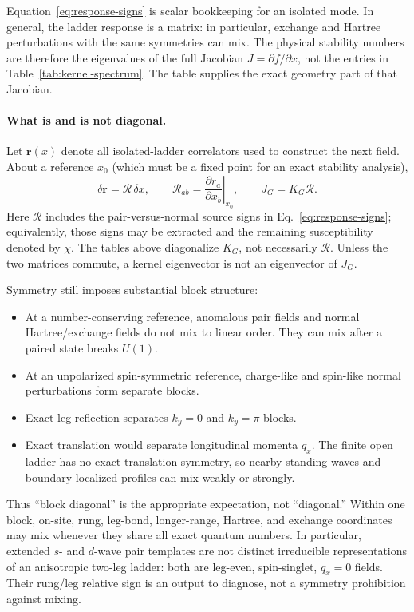 \documentclass[11pt]{article}
\begin{document}
Equation~\eqref{eq:response-signs} is scalar bookkeeping for an isolated mode.
In general, the ladder response is a matrix: in particular, exchange and
Hartree perturbations with the same symmetries can mix.  The physical stability
numbers are therefore the eigenvalues of the full Jacobian
\(J=\partial f/\partial x\), not the entries in
Table~\ref{tab:kernel-spectrum}.  The table supplies the exact geometry part of
that Jacobian.

\paragraph{What is and is not diagonal.}
Let \(\bm r(x)\) denote all isolated-ladder correlators used to construct the
next field.  About a reference \(x_0\) (which must be a fixed point for an exact
stability analysis),
\begin{equation}
 \delta\bm r=\mathcal R\,\delta x,
 \qquad
 \mathcal R_{ab}=\left.\frac{\partial r_a}{\partial x_b}\right|_{x_0},
 \qquad
 J_G=K_G\mathcal R.
 \label{eq:full-response-composition}
\end{equation}
Here \(\mathcal R\) includes the pair-versus-normal source signs in
Eq.~\eqref{eq:response-signs}; equivalently, those signs may be extracted and
the remaining susceptibility denoted by \(\chi\).  The tables above diagonalize
\(K_G\), not necessarily \(\mathcal R\).  Unless the two matrices commute, a
kernel eigenvector is not an eigenvector of \(J_G\).

Symmetry still imposes substantial block structure:
\begin{itemize}
 \item At a number-conserving reference, anomalous pair fields and normal
       Hartree/exchange fields do not mix to linear order.  They can mix after
       a paired state breaks \(U(1)\).
 \item At an unpolarized spin-symmetric reference, charge-like and spin-like
       normal perturbations form separate blocks.
 \item Exact leg reflection separates \(k_y=0\) and \(k_y=\pi\) blocks.
 \item Exact translation would separate longitudinal momenta \(q_x\).  The
       finite open ladder has no exact translation symmetry, so nearby standing
       waves and boundary-localized profiles can mix weakly or strongly.
\end{itemize}
Thus ``block diagonal'' is the appropriate expectation, not ``diagonal.''
Within one block, on-site, rung, leg-bond, longer-range, Hartree, and exchange
coordinates may mix whenever they share all exact quantum numbers.  In
particular, extended \(s\)- and \(d\)-wave pair templates are not distinct
irreducible representations of an anisotropic two-leg ladder: both are
leg-even, spin-singlet, \(q_x=0\) fields.  Their rung/leg relative sign is an
output to diagnose, not a symmetry prohibition against mixing.
\end{document}
